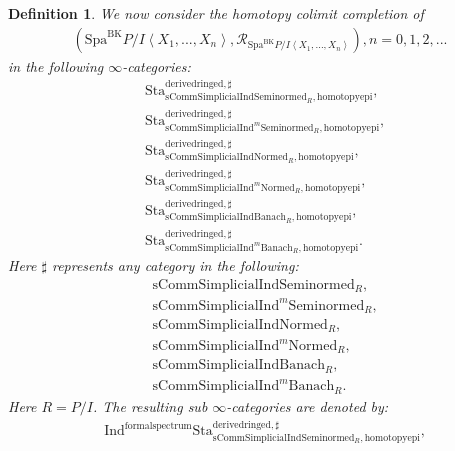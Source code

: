\documentclass[12pt]{book}
\newtheorem{definition}{Definition}
\begin{document}
\begin{definition}
We now consider the homotopy colimit completion of 
\begin{align}
(\mathrm{Spa}^\mathrm{BK}P/I\left<X_1,...,X_n\right>,\mathcal{R}_{\mathrm{Spa}^\mathrm{BK}P/I\left<X_1,...,X_n\right>}),n=0,1,2,...
\end{align}
in the following $\infty$-categories:
\begin{align}
&\mathrm{Sta}^\mathrm{derivedringed,\sharp}_{\mathrm{sComm}\mathrm{Simplicial}\mathrm{Ind}\mathrm{Seminormed}_R,\mathrm{homotopyepi}},\\
&\mathrm{Sta}^\mathrm{derivedringed,\sharp}_{\mathrm{sComm}\mathrm{Simplicial}\mathrm{Ind}^m\mathrm{Seminormed}_R,\mathrm{homotopyepi}},\\
&\mathrm{Sta}^\mathrm{derivedringed,\sharp}_{\mathrm{sComm}\mathrm{Simplicial}\mathrm{Ind}\mathrm{Normed}_R,\mathrm{homotopyepi}},\\
&\mathrm{Sta}^\mathrm{derivedringed,\sharp}_{\mathrm{sComm}\mathrm{Simplicial}\mathrm{Ind}^m\mathrm{Normed}_R,\mathrm{homotopyepi}},\\
&\mathrm{Sta}^\mathrm{derivedringed,\sharp}_{\mathrm{sComm}\mathrm{Simplicial}\mathrm{Ind}\mathrm{Banach}_R,\mathrm{homotopyepi}},\\
&\mathrm{Sta}^\mathrm{derivedringed,\sharp}_{\mathrm{sComm}\mathrm{Simplicial}\mathrm{Ind}^m\mathrm{Banach}_R,\mathrm{homotopyepi}}.	
\end{align}
Here $\sharp$ represents any category in the following:
\begin{align}
&\mathrm{sComm}\mathrm{Simplicial}\mathrm{Ind}\mathrm{Seminormed}_R,\\
&\mathrm{sComm}\mathrm{Simplicial}\mathrm{Ind}^m\mathrm{Seminormed}_R,\\
&\mathrm{sComm}\mathrm{Simplicial}\mathrm{Ind}\mathrm{Normed}_R,\\
&\mathrm{sComm}\mathrm{Simplicial}\mathrm{Ind}^m\mathrm{Normed}_R,\\
&\mathrm{sComm}\mathrm{Simplicial}\mathrm{Ind}\mathrm{Banach}_R,\\
&\mathrm{sComm}\mathrm{Simplicial}\mathrm{Ind}^m\mathrm{Banach}_R.	
\end{align}	
Here $R=P/I$. The resulting sub $\infty$-categories are denoted by:
\begin{align}
&\mathrm{Ind}^\mathrm{formalspectrum}\mathrm{Sta}^\mathrm{derivedringed,\sharp}_{\mathrm{sComm}\mathrm{Simplicial}\mathrm{Ind}\mathrm{Seminormed}_R,\mathrm{homotopyepi}},\\

\end{align}
\end{definition}
\end{document}
